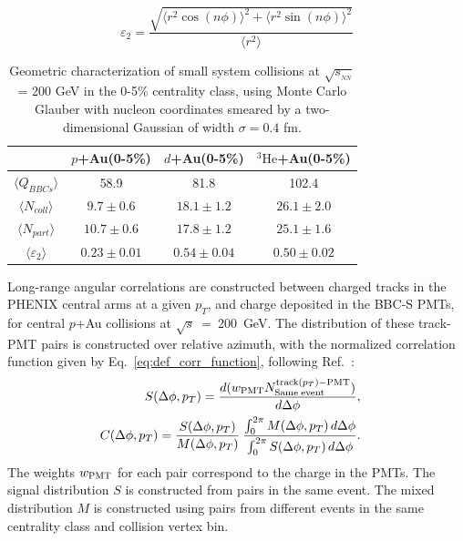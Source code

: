\documentclass[%
reprint,
showpacs,preprintnumbers,
 amsmath,amssymb,
 aps,
]{revtex4-1}
\newcommand{\pt}{\mbox{$p_T$}\xspace}
\newcommand{\sqs}{\mbox{$\sqrt{s}$}\xspace}
\newcommand{\sqsn}{\mbox{$\sqrt{s_{_{NN}}}$}\xspace}
\newcommand{\dau}{\mbox{$d$+Au}\xspace}
\newcommand{\pau}{\mbox{$p$+Au}\xspace}
\newcommand{\hau}{\mbox{$^3\text{He}$+Au}\xspace}
\begin{document}
\begin{equation}
\label{eqn:epsilon2}
\varepsilon_2 = \frac{\sqrt{\langle r^2\cos (n\phi)\rangle ^2 + \langle r^2\sin (n\phi) \rangle ^2}}{\langle r^2 \rangle}
\end{equation}

\begin{table}
\caption{Geometric characterization of small system collisions at \sqsn = 200 GeV in the 0-5\% centrality class, using Monte Carlo Glauber with nucleon coordinates smeared by a two-dimensional Gaussian of width $\sigma=0.4$ fm.}
\begin{ruledtabular}
\begin{tabular}{c c c c}
\label{table_geometry}
 & \pau (0-5\%) & \dau (0-5\%) & \hau (0-5\%) \\
\hline
 $\langle Q_{BBCs} \rangle$ & 58.9 & 81.8 & 102.4 \\
 $\langle N_{coll} \rangle$ & $9.7\pm 0.6$ & $18.1\pm 1.2$ & $26.1\pm 2.0$ \\
 $\langle N_{part} \rangle$ & $10.7\pm 0.6$ & $17.8\pm 1.2$ & $25.1\pm  1.6$ \\ 
 $\langle \varepsilon_2 \rangle$ & $0.23\pm 0.01$ & $0.54\pm 0.04$ & $0.50\pm 0.02$
\end{tabular}
\end{ruledtabular}
\end{table}

Long-range angular correlations are constructed between charged tracks in the PHENIX central arms at a given \pt, and charge deposited in the BBC-S PMTs, for central \pau collisions at \sqs~=~200~GeV. The distribution of these track-PMT pairs is constructed over relative azimuth, with the normalized correlation function given by Eq.~\ref{eq:def_corr_function}, following Ref.~\cite{PhysRevLett.115.142301}:
\begin{eqnarray}
  S(\Delta\phi,p_{T})=
  \frac{ d(w_{{\rm PMT}} N^{{\rm track}(p_{T}){\rm - PMT}}_{{\rm Same \; event}}) }{ d\Delta\phi}, & &
\label{eq31} \\
  C(\Delta\phi,p_{T}) =
          \frac{S(\Delta\phi,p_{T})}{M(\Delta\phi,p_{T})} \:
          \frac{\int_{0}^{2\pi} M(\Delta\phi,p_{T}) \, d\Delta\phi}{\int_{0}^{2\pi} S(\Delta\phi,p_{T}) \, d\Delta\phi}. & &
  \label{eq:def_corr_function}
\end{eqnarray}
The weights $w_{{\rm PMT}}$ for each pair correspond to the charge in the PMTs. The signal distribution $S$ is constructed from pairs in the same event. The mixed distribution $M$ is constructed using pairs from different events in the same centrality class and collision vertex bin.
\end{document}

